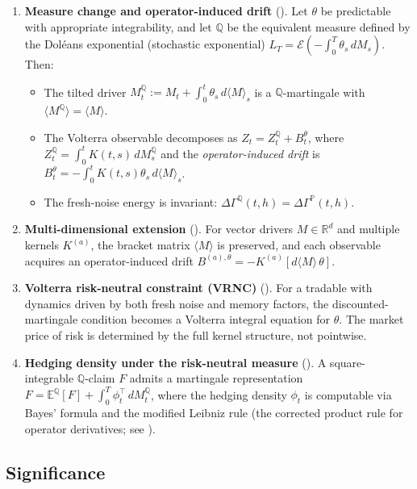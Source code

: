 \documentclass[11pt]{article}
\theoremstyle{plain}
\theoremstyle{definition}
\theoremstyle{remark}
\newcommand{\R}{\mathbb{R}}
\newcommand{\E}{\mathbb{E}}
\newcommand{\PP}{\mathbb{P}}
\newcommand{\QQ}{\mathbb{Q}}
\newcommand{\dGamma}{\Delta\Gamma}
\newcommand{\bracket}[1]{\langle #1 \rangle}
\begin{document}
\begin{enumerate}[label=(\arabic*)]
\item \textbf{Measure change and operator-induced drift} ().
Let $\theta$ be predictable with appropriate integrability, and let $\QQ$ be
the equivalent measure defined by the Dol\'eans exponential (stochastic exponential)
$L_T = \mathcal{E}(-\int_0^T \theta_s\,dM_s)$. Then:
\begin{itemize}
\item The tilted driver $M_t^{\QQ} := M_t + \int_0^t \theta_s\,d\bracket{M}_s$
is a $\QQ$-martingale with $\bracket{M^{\QQ}} = \bracket{M}$.
\item The Volterra observable decomposes as $Z_t = Z_t^{\QQ} + B_t^\theta$, where
$Z_t^{\QQ} = \int_0^t K(t,s)\,dM_s^{\QQ}$ and the \emph{operator-induced drift} is
$B_t^\theta = -\int_0^t K(t,s)\theta_s\,d\bracket{M}_s$.
\item The fresh-noise energy is invariant: $\dGamma^{\QQ}(t,h) = \dGamma^{\PP}(t,h)$.
\end{itemize}

\item \textbf{Multi-dimensional extension} ().
For vector drivers $M \in \R^d$ and multiple kernels $K^{(a)}$, the bracket
matrix $\bracket{M}$ is preserved, and each observable acquires an
operator-induced drift $B^{(a),\theta} = -K^{(a)}[d\bracket{M}\,\theta]$.

\item \textbf{Volterra risk-neutral constraint (VRNC)} ().
For a tradable with dynamics driven by both fresh noise and memory factors,
the discounted-martingale condition becomes a Volterra integral equation for $\theta$.
The market price of risk is determined by the full kernel structure, not pointwise.

\item \textbf{Hedging density under the risk-neutral measure} ().
A square-integrable $\QQ$-claim $F$ admits a martingale representation
$F = \E^{\QQ}[F] + \int_0^T \phi_t^\top\,dM_t^{\QQ}$, where the hedging
density $\phi_t$ is computable via Bayes' formula and the modified Leibniz
rule (the corrected product rule for operator derivatives; see ).
\end{enumerate}

\subsection{Significance}
\end{document}
